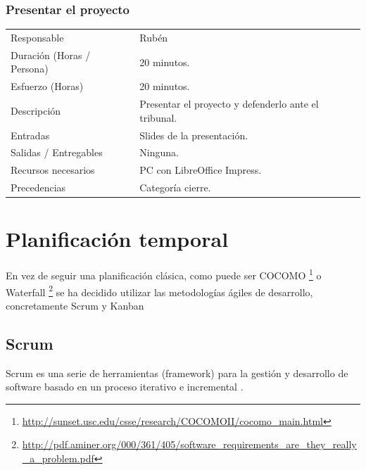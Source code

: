 \subsubsection{Presentar el proyecto}
\begin{table}[H]
    \begin{center}
        \begin{tabular}{l p{8cm}}
            Responsable                           & Rub\'{e}n \\
            Duraci\'{o}n (Horas / Persona)        & 20 minutos. \\ 
            Esfuerzo (Horas)                      & 20 minutos. \\
            Descripci\'{o}n                       & Presentar el proyecto y defenderlo ante el tribunal. \\
            Entradas                              & Slides de la presentaci\'{o}n.\\
            Salidas / Entregables                 & Ninguna. \\
            Recursos necesarios                   & PC con LibreOffice Impress. \\
            Precedencias                          & Categor\'{i}a cierre. \\
        \end{tabular}
    \end{center}
    
\end{table}


\section{Planificaci\'{o}n temporal}
En vez de seguir una planificación cl\'asica, como puede ser COCOMO 
\footnote{\url{http://sunset.usc.edu/csse/research/COCOMOII/cocomo_main.html}} o Waterfall 
\footnote{\url{http://pdf.aminer.org/000/361/405/software_requirements_are_they_really_a_problem.pdf}} se ha decidido utilizar las 
metodologías \'agiles de desarrollo, concretamente Scrum y Kanban

\subsection{Scrum}
Scrum es una serie de herramientas (framework) para la gesti\'on y desarrollo de software basado en un proceso iterativo e incremental 
\cite{Scrum:WhatIsIt}.

